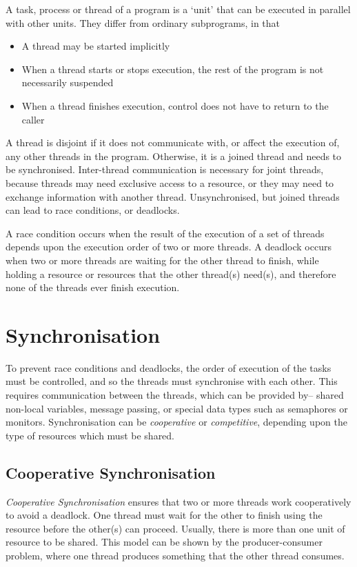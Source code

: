 A task, process or thread of a program is a `unit' that can be executed in parallel with other units. They differ from
 ordinary subprograms, in that
\begin{itemize}
  \item A thread may be started implicitly
  \item When a thread starts or stops execution, the rest of the program is not necessarily suspended
  \item When a thread finishes execution, control does not have to return to the caller
\end{itemize}

A thread is disjoint if it does not communicate with, or affect the execution of, any other threads in the program.
 Otherwise, it is a joined thread and needs to be synchronised. Inter-thread communication is necessary for joint threads,
 because threads may need exclusive access to a resource, or they may need to exchange information with another thread.
 Unsynchronised, but joined threads can lead to race conditions, or deadlocks.

A race condition occurs when the result of the execution of a set of threads depends upon the execution order of two or
 more threads. A deadlock occurs when two or more threads are waiting for the other thread to finish, while holding
 a resource or resources that the other thread(s) need(s), and therefore none of the threads ever finish execution.

\section*{Synchronisation}

To prevent race conditions and deadlocks, the order of execution of the tasks must be controlled, and so the threads must
 synchronise with each other. This requires communication between the threads, which can be provided by-- shared non-local
 variables, message passing, or special data types such as semaphores or monitors. Synchronisation can be \textit{cooperative}
 or \textit{competitive}, depending upon the type of resources which must be shared.

\subsection*{Cooperative Synchronisation}

\textit{Cooperative Synchronisation} ensures that two or more threads work cooperatively to avoid a deadlock. One thread
 must wait for the other to finish using the resource before the other(s) can proceed. Usually, there is more than one
 unit of resource to be shared. This model can be shown by the producer-consumer problem, where one thread produces
 something that the other thread consumes.

